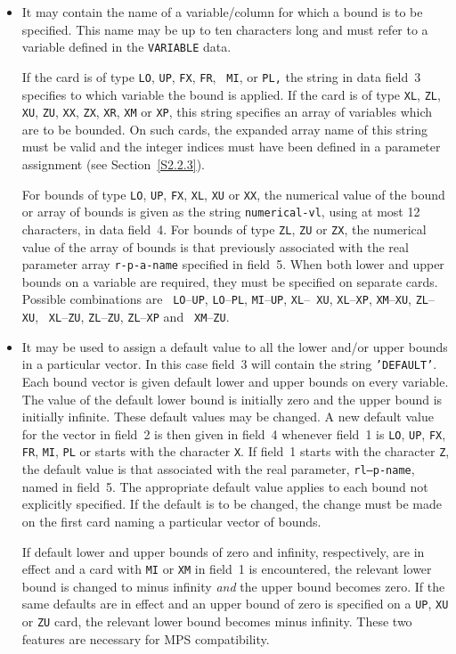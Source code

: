 \documentclass[a4paper]{article}
\begin{document}
\begin{itemize}
\item
It may contain the name of a variable/column for  which  a bound is to
be  specified.  This name may be  up to ten   characters long and must
refer to a variable defined in the {\tt VARIABLE} data.

If the card  is of type  {\tt LO}, {\tt UP},  {\tt FX}, {\tt FR}, {\tt
MI}, or {\tt PL,}
the string in data field~3 specifies  to which variable
the bound is applied.  If the card is of type {\tt XL}, {\tt ZL}, {\tt
XU}, {\tt ZU},  {\tt XX}, {\tt ZX}, {\tt  XR}, {\tt XM} or  {\tt  XP},
this string specifies an array
of variables which  are to be bounded.
On such cards,
the expanded array  name
of this string must  be valid
and the  integer  indices  must  have  been  defined   in  a parameter
assignment (see Section~\ref{S2.2.3}).

For bounds of type {\tt LO}, {\tt UP}, {\tt FX}, {\tt XL}, {\tt XU} or
{\tt XX},
the numerical value of the bound or array
of bounds is given
as the string {\tt numerical-vl}, using at most 12 characters, in data
field~4.  For  bounds of  type {\tt ZL},  {\tt ZU}  or  {\tt  ZX}, the
numerical value of the  array
of bounds is that previously associated
with the real  parameter array {\tt  r-p-a-name} specified in field~5.
When both lower and upper bounds
on a variable are required, they must
be  specified  on separate   cards.
Possible combinations    are {\tt
LO}--{\tt UP}, {\tt LO}--{\tt PL},  {\tt MI}--{\tt UP}, {\tt XL}--{\tt
XU}, {\tt XL}--{\tt XP}, {\tt XM}--{\tt XU},  {\tt ZL}--{\tt XU}, {\tt
XL}--{\tt ZU},   {\tt  ZL}--{\tt  ZU},  {\tt  ZL}--{\tt  XP}  and {\tt
XM}--{\tt ZU}.

\item
It may be used to assign a default value to all the lower and/or upper
bounds
in a particular vector.  In this case  field~3 will contain the
string {\tt 'DEFAULT'}.
Each bound  vector is  given default lower  and upper  bounds on every
variable.  The value of the default lower bound is  initially zero and
the upper bound is initially  infinite.  These default values may  be
changed.  A new default value for the  vector in field~2 is then given
in field~4 whenever field~1 is {\tt LO}, {\tt UP}, {\tt FX}, {\tt FR},
{\tt MI},  {\tt PL}
or starts with  the  character {\tt X}.  If  field~1  starts with  the
character {\tt Z}, the default value is that associated with  the real
parameter,
{\tt  rl--p-name},  named   in field~5.  The   appropriate
default value applies to each bound
not explicitly specified.  If the
default is to be changed, the change must  be  made on  the first card
naming a particular vector of bounds.

If default lower and  upper bounds
of zero and  infinity, respectively,
are in effect and a   card
with  {\tt MI} or   {\tt XM}
in field~1  is
encountered, the  relevant lower bound
is  changed to  minus  infinity
{\em and} the upper bound becomes zero.  If  the  same defaults are in
effect and an upper bound
of zero is specified on a {\tt UP}, {\tt XU}
or {\tt ZU}
card,
the relevant  lower  bound becomes minus  infinity.
These two features are necessary for MPS compatibility.
\end{itemize}
\end{document}
